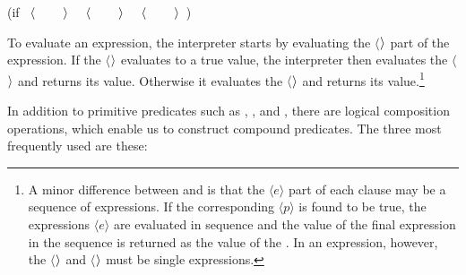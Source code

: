 \begin{codeBlock}
(if ~\(\langle\kern0.07em \)~~~~\(\kern0.06em\rangle \)~ ~\(\langle\kern0.07em \)~~~~\(\kern0.05em\rangle \)~ ~\(\langle\kern0.06em \)~~~~\(\kern0.06em\rangle \)~)
\end{codeBlock}

\noindent
To evaluate an  expression, the interpreter starts by evaluating the
\( \langle \)\( \kern0.04em\rangle \) part of the expression.  If the \( \langle \)\( \kern0.04em\rangle \) evaluates
to a true value, the interpreter then evaluates the \( \langle \)\( \kern0.04em\rangle \) and
returns its value.  Otherwise it evaluates the \( \langle \)\( \kern0.04em\rangle \) and returns
its value.\footnote{A minor difference between  and  is
that the \( \langle{e}\rangle \) part of each  clause may be a sequence of
expressions.  If the corresponding \( \langle{p}\rangle \) is found to be true, the
expressions \( \langle{e}\rangle \) are evaluated in sequence and the value of the final
expression in the sequence is returned as the value of the .  In an
 expression, however, the \( \langle \)\( \kern0.04em\rangle \) and \( \langle \)\( \kern0.04em\rangle \)
must be single expressions.}

In addition to primitive predicates such as \code{<}, \code{=}, and \code{>},
there are logical composition operations, which enable us to construct compound
predicates. The three most frequently used are these:

